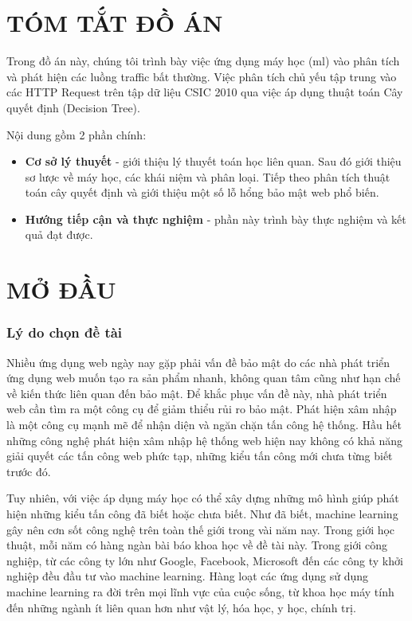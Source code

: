 \documentclass[../main-report.tex]{subfiles}
\begin{document}
\part*{TÓM TẮT ĐỒ ÁN}
Trong đồ án này, chúng tôi trình bày việc ứng dụng máy học (\Gls{ml}) vào phân tích và phát hiện các luồng traffic bất thường.
Việc phân tích chủ yếu tập trung vào các HTTP Request trên tập dữ liệu CSIC 2010 qua việc áp dụng thuật toán Cây quyết định (Decision Tree).

Nội dung gồm 2 phần chính:

\begin{itemize}
\item \textbf{Cơ sở lý thuyết} - giới thiệu lý thuyết toán học liên quan. Sau đó giới thiệu sơ lược về máy học, các khái niệm và phân loại. Tiếp theo phân tích thuật toán cây quyết định và giới thiệu một số lỗ hổng bảo mật web phổ biến.
\item \textbf{Hướng tiếp cận và thực nghiệm} - phần này trình bày thực nghiệm và kết quả đạt được.
\end{itemize}

\newpage
\part*{MỞ ĐẦU}
\section*{Lý do chọn đề tài}
Nhiều ứng dụng web ngày nay gặp phải vấn đề bảo mật do các nhà phát triển ứng dụng web muốn tạo ra sản phẩm nhanh, không quan tâm cũng như hạn chế về kiến thức liên quan đến bảo mật. Để khắc phục vấn đề này, nhà phát triển web cần tìm ra một công cụ để giảm thiểu rủi ro bảo mật. Phát hiện xâm nhập là một công cụ mạnh mẽ để nhận diện và ngăn chặn tấn công hệ thống. Hầu hết những công nghệ phát hiện xâm nhập hệ thống web hiện nay không có khả năng giải quyết các tấn công web phức tạp, những kiểu tấn công mới chưa từng biết trước đó.

Tuy nhiên, với việc áp dụng máy học có thể xây dựng những mô hình giúp phát hiện những kiểu tấn công đã biết hoặc chưa biết. Như đã biết, machine learning gây nên cơn sốt công nghệ trên toàn thế giới trong vài năm nay. Trong giới học thuật, mỗi năm có hàng ngàn bài báo khoa học về đề tài này. Trong giới công nghiệp, từ các công ty lớn như Google, Facebook, Microsoft đến các công ty khởi nghiệp đều đầu tư vào machine learning. Hàng loạt các ứng dụng sử dụng machine learning ra đời trên mọi lĩnh vực của cuộc sống, từ khoa học máy tính đến những ngành ít liên quan hơn như vật lý, hóa học, y học, chính trị.
\end{document}
